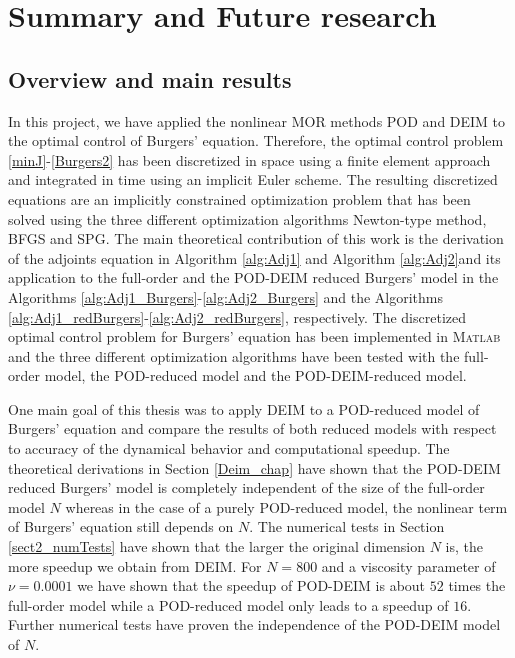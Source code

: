 \chapter{Summary and Future research}
\section{Overview and main results}
In this project, we have applied the nonlinear MOR methods POD and DEIM to the optimal control of Burgers' equation. Therefore, the optimal control problem \eqref{minJ}-\eqref{Burgers2} has been discretized in space using a finite element approach and integrated in time using an implicit Euler scheme. The resulting discretized equations are an implicitly constrained optimization problem that has been solved using the three different optimization algorithms Newton-type method, BFGS and SPG. The main theoretical contribution of this work is the derivation of the adjoints equation in Algorithm \ref{alg:Adj1} and Algorithm \ref{alg:Adj2}and its application to the full-order and the POD-DEIM reduced Burgers' model in the Algorithms \ref{alg:Adj1_Burgers}-\ref{alg:Adj2_Burgers} and the Algorithms \ref{alg:Adj1_redBurgers}-\ref{alg:Adj2_redBurgers}, respectively. The discretized optimal control problem for Burgers' equation has been implemented in \textsc{Matlab} and the three different optimization algorithms have been tested with the full-order model, the POD-reduced model and the POD-DEIM-reduced model.

One main goal of this thesis was to apply DEIM to a POD-reduced model of Burgers' equation and compare the results of both reduced models with respect to accuracy of the dynamical behavior and computational speedup. The theoretical derivations in Section \ref{Deim_chap} have shown that the POD-DEIM reduced Burgers' model is completely independent of the size of the full-order model $N$ whereas in the case of a purely POD-reduced model, the nonlinear term of Burgers' equation still depends on $N$. The numerical tests in Section \ref{sect2_numTests} have shown that the larger the original dimension $N$ is, the more speedup we obtain from DEIM. For $N=800$ and a viscosity parameter of $\nu = 0.0001$ we have shown that the speedup of POD-DEIM is about $52$ times the full-order model while a POD-reduced model only leads to a speedup of $16$. Further numerical tests have proven the independence of the POD-DEIM model of $N$.

